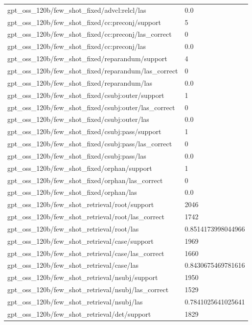 \begin{tabular}{ll}
gpt\_oss\_120b/few\_shot\_fixed/advcl:relcl/las & 0.0 \\
gpt\_oss\_120b/few\_shot\_fixed/cc:preconj/support & 5 \\
gpt\_oss\_120b/few\_shot\_fixed/cc:preconj/las\_correct & 0 \\
gpt\_oss\_120b/few\_shot\_fixed/cc:preconj/las & 0.0 \\
gpt\_oss\_120b/few\_shot\_fixed/reparandum/support & 4 \\
gpt\_oss\_120b/few\_shot\_fixed/reparandum/las\_correct & 0 \\
gpt\_oss\_120b/few\_shot\_fixed/reparandum/las & 0.0 \\
gpt\_oss\_120b/few\_shot\_fixed/csubj:outer/support & 1 \\
gpt\_oss\_120b/few\_shot\_fixed/csubj:outer/las\_correct & 0 \\
gpt\_oss\_120b/few\_shot\_fixed/csubj:outer/las & 0.0 \\
gpt\_oss\_120b/few\_shot\_fixed/csubj:pass/support & 1 \\
gpt\_oss\_120b/few\_shot\_fixed/csubj:pass/las\_correct & 0 \\
gpt\_oss\_120b/few\_shot\_fixed/csubj:pass/las & 0.0 \\
gpt\_oss\_120b/few\_shot\_fixed/orphan/support & 1 \\
gpt\_oss\_120b/few\_shot\_fixed/orphan/las\_correct & 0 \\
gpt\_oss\_120b/few\_shot\_fixed/orphan/las & 0.0 \\
gpt\_oss\_120b/few\_shot\_retrieval/root/support & 2046 \\
gpt\_oss\_120b/few\_shot\_retrieval/root/las\_correct & 1742 \\
gpt\_oss\_120b/few\_shot\_retrieval/root/las & 0.8514173998044966 \\
gpt\_oss\_120b/few\_shot\_retrieval/case/support & 1969 \\
gpt\_oss\_120b/few\_shot\_retrieval/case/las\_correct & 1660 \\
gpt\_oss\_120b/few\_shot\_retrieval/case/las & 0.8430675469781616 \\
gpt\_oss\_120b/few\_shot\_retrieval/nsubj/support & 1950 \\
gpt\_oss\_120b/few\_shot\_retrieval/nsubj/las\_correct & 1529 \\
gpt\_oss\_120b/few\_shot\_retrieval/nsubj/las & 0.7841025641025641 \\
gpt\_oss\_120b/few\_shot\_retrieval/det/support & 1829 \\

\end{tabular}
